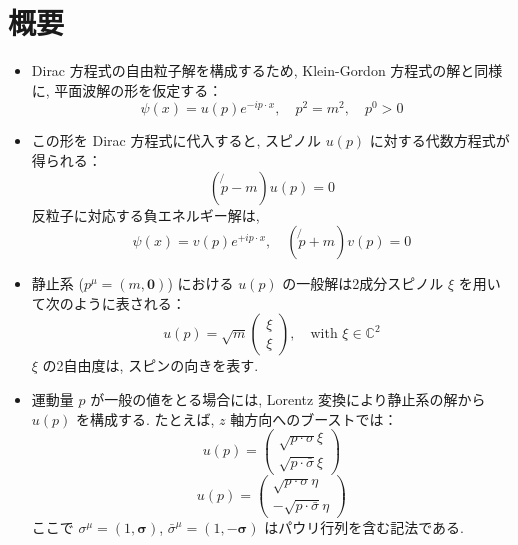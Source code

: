\documentclass[a4paper,12pt]{article}
\begin{document}
\section*{概要}
\begin{itemize}
  \item Dirac 方程式の自由粒子解を構成するため, Klein-Gordon 方程式の解と同様に, 平面波解の形を仮定する：
  \begin{equation*}
    \psi(x) = u(p) e^{-ip \cdot x}, \quad p^2 = m^2, \quad p^0 > 0
  \end{equation*}
  \item この形を Dirac 方程式に代入すると, スピノル $u(p)$ に対する代数方程式が得られる：
  \begin{equation*}
    (\not{p} - m) u(p) = 0
  \end{equation*}
  反粒子に対応する負エネルギー解は,
  \begin{equation*}
    \psi(x) = v(p) e^{+ip \cdot x}, \quad (\not{p} + m) v(p) = 0
  \end{equation*}

  \item 静止系 ($p^\mu = (m, \mathbf{0})$) における $u(p)$ の一般解は2成分スピノル $\xi$ を用いて次のように表される：
  \begin{equation*}
    u(p) = \sqrt{m}
    \begin{pmatrix}
      \xi \\
      \xi
    \end{pmatrix}, \quad \text{with } \xi \in \mathbb{C}^2
  \end{equation*}
  $\xi$ の2自由度は, スピンの向きを表す.

  \item 運動量 $p$ が一般の値をとる場合には, Lorentz 変換により静止系の解から $u(p)$ を構成する. たとえば, $z$ 軸方向へのブーストでは：
  \begin{equation*}
    u(p) =  \begin{pmatrix}
      \sqrt{p \cdot \sigma}\xi \\
      \sqrt{p \cdot \bar{\sigma}}\xi
    \end{pmatrix}
  \end{equation*}
  \begin{equation*}
    u(p) =  \begin{pmatrix}
      \sqrt{p \cdot \sigma}\eta \\
      -\sqrt{p \cdot \bar{\sigma}}\eta
    \end{pmatrix}
  \end{equation*}
  ここで $\sigma^\mu = (1, \boldsymbol{\sigma})$, $\bar{\sigma}^\mu = (1, -\boldsymbol{\sigma})$ はパウリ行列を含む記法である.


\end{itemize}
\end{document}
